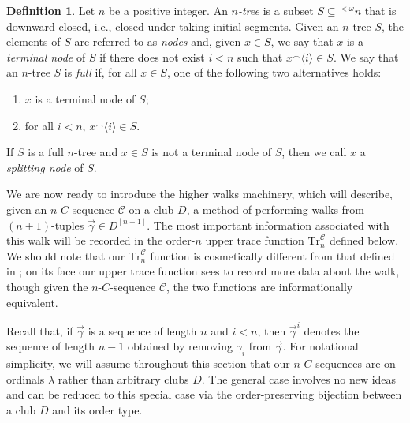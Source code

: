 \documentclass{amsart}
\numberwithin{theorem}{section}
\theoremstyle{definition}
\newtheorem{definition}[theorem]{Definition}
\newcommand{\mc}{\mathcal}
\newcommand{\Tr}{\mathrm{Tr}}
\begin{document}
\begin{definition}
  Let $n$ be a positive integer. An \emph{$n$-tree} is a subset $S \subseteq 
  {^{<\omega}}n$ that is downward closed, i.e., closed under taking initial segments. 
  Given an $n$-tree $S$, the elements of $S$ are referred to as \emph{nodes} and, 
  given $x \in S$, we say that $x$ is a \emph{terminal node} of $S$ if there does 
  not exist $i < n$ such that $x^\smallfrown \langle i \rangle \in S$. We say that 
  an $n$-tree $S$ is \emph{full} if, for all $x \in S$, one of the following two 
  alternatives holds:
  \begin{enumerate}
    \item $x$ is a terminal node of $S$;
    \item for all $i < n$, $x^\smallfrown \langle i \rangle \in S$.
  \end{enumerate}
  If $S$ is a full $n$-tree and $x \in S$ is not a terminal node of $S$, then we call 
  $x$ a \emph{splitting node} of $S$.
\end{definition}

We are now ready to introduce the higher walks machinery, which will describe, given an 
$n$-$C$-sequence $\mc{C}$ on a club $D$, a method of performing walks from 
$(n+1)$-tuples $\vec{\gamma} \in D^{[n+1]}$. The most important information associated with 
this walk will be recorded in the order-$n$ upper trace function $\Tr_n^{\mc{C}}$ defined 
below. We should note that our $\Tr_n^{\mc{C}}$ function is cosmetically different from 
that defined in \cite{bergfalk2024introductionhigherwalks}; on its face our upper trace function  
sees to record more data about the walk, though given the $n$-$C$-sequence $\mc{C}$, the two functions 
are informationally equivalent.

Recall that, if $\vec{\gamma}$ is a sequence of length $n$ and $i < n$, then $\vec{\gamma}^i$ 
denotes the sequence of length $n - 1$ obtained by removing $\gamma_i$ from $\vec{\gamma}$.
For notational simplicity, we will assume throughout this section that our $n$-$C$-sequences 
are on ordinals $\lambda$ rather than arbitrary clubs $D$. The general case involves no new ideas 
and can be reduced to this special case via the order-preserving bijection between a club 
$D$ and its order type.
\end{document}
